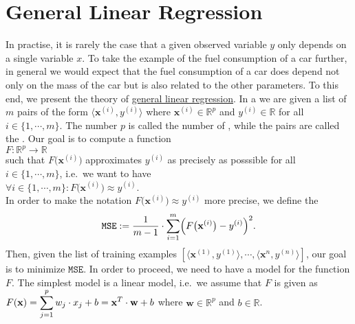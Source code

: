 \section{General Linear Regression}
In practise, it is rarely the case that a given observed variable $y$ only depends on a single variable $x$.
To take the example of the fuel consumption of a car further, in general we would expect that the fuel consumption
of a car does depend not only on the mass of the car but is also related to the other parameters.  
To this end, we present the theory of   
\href{https://en.wikipedia.org/wiki/Linear_regression}{general linear regression}.
In a  we are given a list of $m$ pairs of the form $\langle\mathbf{x}^{(i)}, y^{(i)} \rangle$ 
where $\mathbf{x}^{(i)} \in \mathbb{R}^p$ and $y^{(i)} \in \mathbb{R}$ for all $i \in \{1,\cdots,m\}$.  The
number $p$ is called the number of , while the pairs are called the .
Our goal is to compute a function 
\\[0.2cm]
\hspace*{1.3cm}
$F:\mathbb{R}^p \rightarrow \mathbb{R}$
\\[0.2cm]  
such that $F\bigl(\mathbf{x}^{(i)}\bigr)$ approximates  $y^{(i)}$ as precisely as posssible
for all $i\in\{1,\cdots,m\}$, i.e.~we want to have
\\[0.2cm]
\hspace*{1.3cm}
$\forall i\in\{1,\cdots,m\}:F\bigl(\mathbf{x}^{(i)}\bigr) \approx y^{(i)}$.
\\[0.2cm]
In order to make the notation $F\bigl(\mathbf{x}^{(i)}\bigr) \approx y^{(i)}$ more precise, we
define the  
\begin{equation}
  \label{eq:squared-error-1}
  \mathtt{MSE} := \frac{1}{m-1} \cdot \sum\limits_{i=1}^{m} \Bigl(F\bigl(\mathbf{x}^{(i)}\bigr) - y^{(i)}\Bigr)^2. 
\end{equation}
Then, given the list of training examples $[\langle \mathbf{x}^{(1)}, y^{(1)} \rangle, \cdots, \langle
\mathbf{x}^{n}, y^{(n)} \rangle]$, our goal is to minimize $\mathtt{MSE}$.  
In order to proceed, we need to have a model for the function $F$.  The simplest model is a linear
model, i.e.~we assume that $F$ is given as 
\\[0.2cm]
\hspace*{1.3cm}
$\displaystyle F(\mathbf{x}) = \sum\limits_{j=1}^p w_j \cdot x_j + b = \mathbf{x}^T \cdot \mathbf{w} + b$ \quad where $\mathbf{w} \in \mathbb{R}^p$ and $b\in\mathbb{R}$.
\\[0.2cm]

